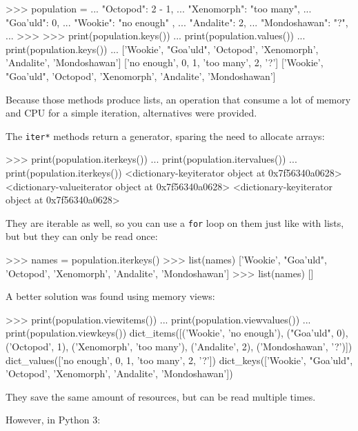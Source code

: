 \begin{py2}
>>> population = {
...     "Octopod": 2 - 1,
...     "Xenomorph": "too many",
...     "Goa'uld": 0,
...     "Wookie": "no enough" ,
...     "Andalite": 2,
...     "Mondoshawan": "?",
... }
>>>
>>> print(population.keys())
... print(population.values())
... print(population.keys())
...
['Wookie', "Goa'uld", 'Octopod', 'Xenomorph', 'Andalite', 'Mondoshawan']
['no enough', 0, 1, 'too many', 2, '?']
['Wookie', "Goa'uld", 'Octopod', 'Xenomorph', 'Andalite', 'Mondoshawan']
\end{py2}

Because those methods produce lists, an operation that consume a lot of memory and CPU for a simple iteration, alternatives were provided.

The \lstinline{iter*} methods return a generator, sparing the need to allocate arrays:

\begin{py2}
>>> print(population.iterkeys())
... print(population.itervalues())
... print(population.iterkeys())
<dictionary-keyiterator object at 0x7f56340a0628>
<dictionary-valueiterator object at 0x7f56340a0628>
<dictionary-keyiterator object at 0x7f56340a0628>
\end{py2}

They are \gls{iterable} as well, so you can use a \lstinline{for} loop on them just like with lists, but but they can only be read once:

\begin{py2}
>>> names = population.iterkeys()
>>> list(names)
['Wookie', "Goa'uld", 'Octopod', 'Xenomorph', 'Andalite', 'Mondoshawan']
>>> list(names)
[]
\end{py2}

A better solution was found using memory views:

\begin{py2}
>>> print(population.viewitems())
... print(population.viewvalues())
... print(population.viewkeys())
dict_items([('Wookie', 'no enough'), ("Goa'uld", 0), ('Octopod', 1), ('Xenomorph', 'too many'), ('Andalite', 2), ('Mondoshawan', '?')])
dict_values(['no enough', 0, 1, 'too many', 2, '?'])
dict_keys(['Wookie', "Goa'uld", 'Octopod', 'Xenomorph', 'Andalite', 'Mondoshawan'])

\end{py2}

They save the same amount of resources, but can be read multiple times.

However, in Python 3:

